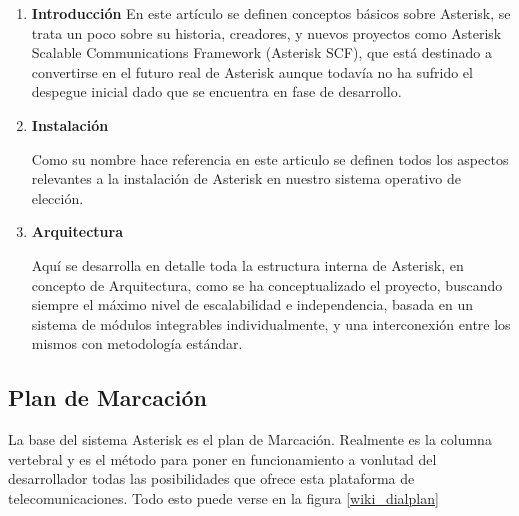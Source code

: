 \begin{enumerate}
	  \setlength{\itemsep}{10pt}

	\item \textbf{Introducción}
	En este artículo se definen conceptos básicos sobre Asterisk, se trata un poco sobre su historia, creadores, y nuevos proyectos como Asterisk Scalable Communications Framework (Asterisk SCF), que está destinado a convertirse en el futuro real de Asterisk aunque todavía no ha sufrido el despegue inicial dado que se encuentra en fase de desarrollo.
	
	\item \textbf{Instalación}
	
	Como su nombre hace referencia en este articulo se definen todos los aspectos relevantes a la instalación de Asterisk en nuestro sistema operativo de elección.
	
	\item \textbf{Arquitectura}
	
	Aquí se desarrolla en detalle toda la estructura interna de Asterisk, en concepto de Arquitectura, como se ha conceptualizado el proyecto, buscando siempre el máximo nivel de escalabilidad e independencia, basada en un sistema de módulos integrables individualmente, y una interconexión entre los mismos con metodología estándar.
	
\end{enumerate}


\subsection{Plan de Marcación}

La base del sistema Asterisk es el plan de Marcación. Realmente es la columna vertebral y es el método para poner en funcionamiento a vonlutad del desarrollador todas las posibilidades que ofrece esta plataforma de telecomunicaciones. Todo esto puede verse en la figura \ref{wiki_dialplan}

